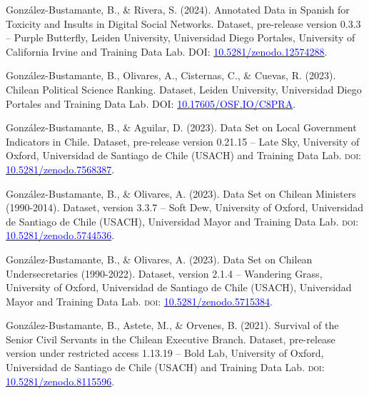\begin{publications}

\begin{benumerate}{6}

\item{González-Bustamante, B., \& Rivera, S. (2024). Annotated Data in Spanish for Toxicity and Insults in Digital Social Networks. Dataset, pre-release version 0.3.3 -- Purple Butterfly, Leiden University, Universidad Diego Portales, University of California Irvine and Training Data Lab. DOI: \href{https://zenodo.org/doi/10.5281/zenodo.12574288}{\textcolor{blue}{10.5281/zenodo.12574288}}.}\vspace{1mm}

\item{González-Bustamante, B., Olivares, A., Cisternas, C., \& Cuevas, R. (2023). Chilean Political Science Ranking. Dataset, Leiden University, Universidad Diego Portales and Training Data Lab. DOI: \href{http://doi.org/10.17605/OSF.IO/C8PRA}{\textcolor{blue}{10.17605/OSF.IO/C8PRA}}.}\vspace{1mm}

\item{González-Bustamante, B., \& Aguilar, D. (2023). Data Set on Local Government Indicators in Chile. Dataset, pre-release version 0.21.15 -- Late Sky, University of Oxford, Universidad de Santiago de Chile (USACH) and Training Data Lab. {\scshape doi:} \href{https://doi.org/10.5281/zenodo.7568387}{\textcolor{blue}{10.5281/zenodo.7568387}}.}\vspace{1mm}

\item{González-Bustamante, B., \& Olivares, A. (2023). Data Set on Chilean Ministers (1990-2014). Dataset, version 3.3.7 -- Soft Dew, University of Oxford, Universidad de Santiago de Chile (USACH), Universidad Mayor and Training Data Lab. {\scshape doi:} \href{https://doi.org/10.5281/zenodo.5744536}{\textcolor{blue}{10.5281/zenodo.5744536}}.}\vspace{1mm}

\item{González-Bustamante, B., \& Olivares, A. (2023). Data Set on Chilean Undersecretaries (1990-2022). Dataset, version 2.1.4 -- Wandering Grass, University of Oxford, Universidad de Santiago de Chile (USACH), Universidad Mayor and Training Data Lab. {\scshape doi:} \href{https://doi.org/10.5281/zenodo.5715384}{\textcolor{blue}{10.5281/zenodo.5715384}}.}\vspace{1mm}

\item{González-Bustamante, B., Astete, M., \& Orvenes, B. (2021). Survival of the Senior Civil Servants in the Chilean Executive Branch. Dataset, pre-release version under restricted access 1.13.19 -- Bold Lab, University of Oxford, Universidad de Santiago de Chile (USACH) and Training Data Lab. {\scshape doi:} \href{https://doi.org/10.5281/zenodo.8115596}{\textcolor{blue}{10.5281/zenodo.8115596}}.}\vspace{1mm}

\end{benumerate}

\end{publications}